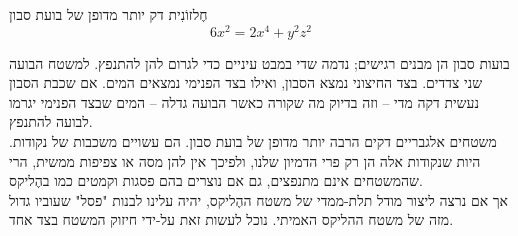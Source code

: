 \begin{surferPage}{חֶלזוֹנִית}
דק יותר מדופן של בועת סבון\\
  \smallskip
\[6x^2	= 2x^4	+ y^2	z^2\]

\singlespacing
בועות סבון הן מבנים רגישים; נדמה שדי במבט עיניים כדי לגרום להן להתנפץ. למשטח הבועה שני צדדים. בצד החיצוני נמצא הסבון, ואילו בצד הפנימי נמצאים המים. אם שכבת הסבון נעשית דקה מדי – וזה בדיוק מה שקורה כאשר הבועה גדלה – המים שבצד הפנימי יגרמו לבועה להתנפץ.\\
\vspace{0,3cm}
משטחים אלגבריים דקים הרבה יותר מדופן של בועת סבון. הם עשויים משכבות של נקודות. היות שנקודות אלה הן רק פרי הדמיון שלנו, ולפיכך אין להן מסה או צפיפות ממשית, הרי שהמשטחים אינם מתנפצים, גם אם נוצרים בהם פסגות וקמטים כמו בהֶליקס.\\
\vspace{0,3cm}
אך אם נרצה ליצור מודל תלת-ממדי של משטח ההֶליקס, יהיה עלינו לבנות "פסל" שעוביו גדול מזה של משטח ההליקס האמיתי. נוכל לעשות זאת על-ידי חיזוק המשטח בצד אחד.
\end{surferPage}
